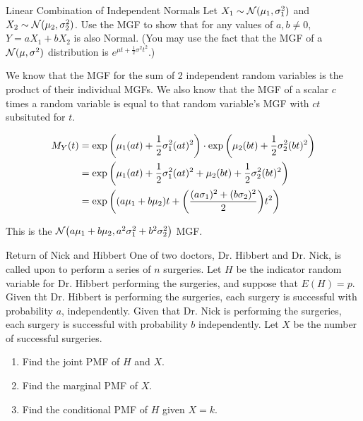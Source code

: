 \documentclass[11.5pt]{article}
\begin{document}
\begin{exercise}{Linear Combination of Independent Normals} 
Let $X_1 \sim \mathcal{N}(\mu_1, \sigma_1^2)$ and $X_2 \sim \mathcal{N}(\mu_2, \sigma_2^2)$. Use the MGF to show that for any values of $a, b \not= 0$, $Y = a X_1 + b X_2$ is also Normal. (You may use the fact that the MGF of a $\mathcal{N}(\mu, \sigma^2)$ distribution is $e^{\mu t + \frac{1}{2}\sigma^2 t^2}$.)  
\end{exercise}

\begin{solution}{4} 
We know that the MGF for the sum of 2 independent random variables is the product of their individual MGFs. We also know that the MGF of a scalar $c$ times a random variable is equal to that random variable's MGF with $ct$ subsituted for $t$. 

\begin{align*}
M_Y(t) &= \exp \left(\mu_1 (at) + \frac{1}{2} \sigma_1^2 (at)^2\right) \cdot \exp\left(\mu_2 (bt) + \frac{1}{2} \sigma_2^2 (bt)^2\right) \\ 
&=
\exp\left( \mu_1 (at) + \frac{1}{2} \sigma_1^2 (at)^2 + \mu_2 (bt) + \frac{1}{2} \sigma_2^2 (bt)^2\right) \\ 
&= \exp\left( (a\mu_1 + b \mu_2)t  + \paren{\frac{(a \sigma_1)^2 + (b \sigma_2)^2}{2} } t^2\right) 
\end{align*}

This is the $\N\paren{a \mu_1 + b \mu_2, a^2 \sigma_1^2 + b^2 \sigma_2^2}$ MGF.
\end{solution} 

\begin{exercise}{Return of Nick and Hibbert}
One of two doctors, Dr. Hibbert and Dr. Nick, is called upon to perform a series of $n$ surgeries. Let $H$ be the indicator random variable for Dr. Hibbert performing the surgeries, and suppose that $E(H) = p$. Given tht Dr. Hibbert is performing the surgeries, each surgery is successful with probability $a$, independently. Given that Dr. Nick is performing the surgeries, each surgery is successful with probability $b$ independently. Let $X$ be the number of successful surgeries. 

\begin{enumerate}
    \item Find the joint PMF of $H$ and $X$.
    \item Find the marginal PMF of $X$. 
    \item Find the conditional PMF of $H$ given $X=k$. 
\end{enumerate}
\end{exercise}
\end{document}
